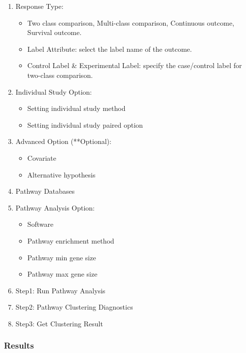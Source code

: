 \begin{enumerate}
  \item Response Type:
   \begin{itemize}
     \item Two class comparison, Multi-class comparison, Continuous outcome, Survival outcome.
     \item Label Attribute: select the label name of the outcome.
     \item Control Label \& Experimental Label: specify the case/control label for two-class comparison.
    \end{itemize}
   \item Individual Study Option:
     \begin{itemize}
     \item Setting individual study method
     \item Setting individual study paired option
    \end{itemize} 
   \item Advanced Option (**Optional):
     \begin{itemize}
      \item Covariate
      \item Alternative hypothesis
    \end{itemize} 
    \item Pathway Databases
    \item Pathway Analysis Option:
         \begin{itemize}
       \item Software
      \item Pathway enrichment method
      \item Pathway min gene size
      \item Pathway max gene size
    \end{itemize} 
    \item Step1: Run Pathway Analysis
    \item Step2: Pathway Clustering Diagnostics
    \item Step3: Get Clustering Result
\end{enumerate}


\subsubsection{Results}

